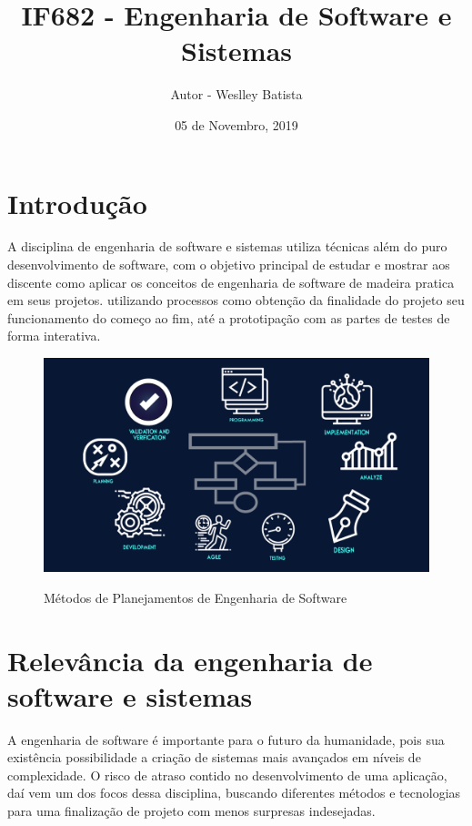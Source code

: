 \documentclass{article}
\title{IF682 - Engenharia de Software e Sistemas}
\author{Autor - Weslley Batista}
\date{05 de Novembro, 2019}
\begin{document}
\maketitle

\section{Introdução}
A disciplina de engenharia de software e sistemas utiliza técnicas além do puro desenvolvimento de software, com  o objetivo principal de estudar e mostrar aos discente como aplicar os conceitos de engenharia de software de madeira pratica em seus projetos. utilizando processos como obtenção da finalidade do projeto
seu funcionamento do começo ao fim, até a prototipação com as partes de testes de forma interativa.

\begin{figure}[h!]
\centering
\includegraphics[scale=0.25]{Metodos.png}
\caption{Métodos de Planejamentos  de Engenharia de Software}
\citep{FotoAgeis}
\label{fig:universe}
\end{figure}                                %

\section{Relevância da engenharia de software e sistemas}

A engenharia de software é importante para o futuro da humanidade, pois sua existência possibilidade a criação de sistemas mais avançados em níveis de complexidade.
O risco de atraso contido no desenvolvimento de uma aplicação, daí vem um dos focos dessa disciplina, buscando diferentes métodos e tecnologias para uma finalização
de projeto com menos surpresas indesejadas.
\citep{Sommerville}
\end{document}
